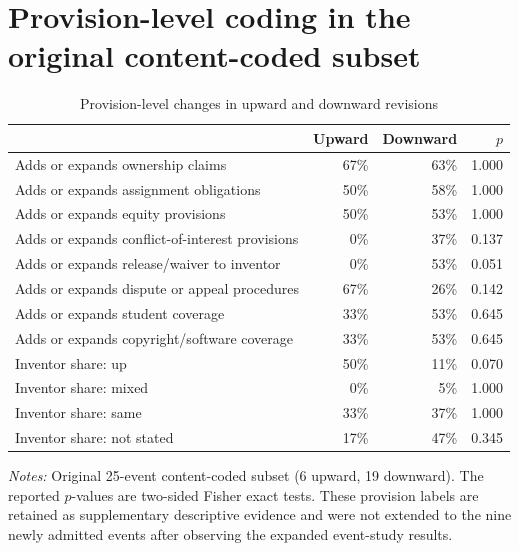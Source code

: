 \section{Provision-level coding in the original content-coded subset}\label{app:provisions}

\begin{table}[htbp]\centering
\caption{Provision-level changes in upward and downward revisions}\label{tab:provisions}
\begin{threeparttable}\footnotesize
\begin{tabular}{p{8.6cm}rrr}\toprule
 & Upward & Downward & $p$ \\\midrule
Adds or expands ownership claims & 67\% & 63\% & 1.000 \\
Adds or expands assignment obligations & 50\% & 58\% & 1.000 \\
Adds or expands equity provisions & 50\% & 53\% & 1.000 \\
Adds or expands conflict-of-interest provisions & 0\% & 37\% & 0.137 \\
Adds or expands release/waiver to inventor & 0\% & 53\% & 0.051 \\
Adds or expands dispute or appeal procedures & 67\% & 26\% & 0.142 \\
Adds or expands student coverage & 33\% & 53\% & 0.645 \\
Adds or expands copyright/software coverage & 33\% & 53\% & 0.645 \\
\midrule
Inventor share: up & 50\% & 11\% & 0.070 \\
Inventor share: mixed & 0\% & 5\% & 1.000 \\
Inventor share: same & 33\% & 37\% & 1.000 \\
Inventor share: not stated & 17\% & 47\% & 0.345 \\
\bottomrule
\end{tabular}
\begin{tablenotes}[flushleft]\footnotesize
\item \textit{Notes:} Original 25-event content-coded subset (6 upward, 19 downward). The reported $p$-values are two-sided Fisher exact tests. These provision labels are retained as supplementary descriptive evidence and were not extended to the nine newly admitted events after observing the expanded event-study results.
\end{tablenotes}
\end{threeparttable}
\end{table}
